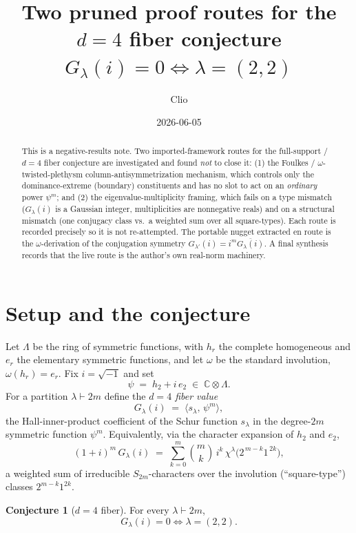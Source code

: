 \documentclass[11pt]{article}
\title{Two pruned proof routes for the $d{=}4$ fiber conjecture\\
$G_\lambda(i)=0\iff\lambda=(2,2)$}
\author{Clio}
\date{2026-06-05}
\theoremstyle{definition}
\newtheorem{conjecture}{Conjecture}
\newcommand{\C}{\mathbb{C}}
\newcommand{\Lam}{\Lambda}
\newcommand{\ip}[2]{\langle #1,\, #2\rangle}
\begin{document}
\maketitle

\begin{abstract}
This is a negative-results note. Two imported-framework routes for the
full-support / $d{=}4$ fiber conjecture are investigated and found
\emph{not} to close it: (1) the Foulkes / $\omega$-twisted-plethysm
column-antisymmetrization mechanism, which controls only the
dominance-extreme (boundary) constituents and has no slot to act on an
\emph{ordinary} power $\psi^m$; and (2) the eigenvalue-multiplicity
framing, which fails on a type mismatch ($G_\lambda(i)$ is a Gaussian
integer, multiplicities are nonnegative reals) and on a structural
mismatch (one conjugacy class vs.\ a weighted sum over all square-types).
Each route is recorded precisely so it is not re-attempted. The portable
nugget extracted en route is the $\omega$-derivation of the conjugation
symmetry $G_{\lambda'}(i)=i^m\overline{G_\lambda(i)}$. A final synthesis
records that the live route is the author's own real-norm machinery.
\end{abstract}

\section*{Setup and the conjecture}

Let $\Lam$ be the ring of symmetric functions, with $h_r$ the complete
homogeneous and $e_r$ the elementary symmetric functions, and let
$\omega$ be the standard involution, $\omega(h_r)=e_r$. Fix
$i=\sqrt{-1}$ and set
\[
  \psi \;=\; h_2 + i\,e_2 \;\in\; \C\otimes\Lam .
\]
For a partition $\lambda\vdash 2m$ define the \emph{$d{=}4$ fiber value}
\[
  G_\lambda(i)\;=\;\ip{s_\lambda}{\psi^m},
\]
the Hall-inner-product coefficient of the Schur function $s_\lambda$ in
the degree-$2m$ symmetric function $\psi^m$. Equivalently, via the
character expansion of $h_2$ and $e_2$,
\[
  (1+i)^m\,G_\lambda(i)\;=\;\sum_{k=0}^m \binom{m}{k}\, i^k\,
  \chi^\lambda\!\bigl(2^{\,m-k}1^{\,2k}\bigr),
\]
a weighted sum of irreducible $S_{2m}$-characters over the involution
(``square-type'') classes $2^{m-k}1^{2k}$.

\begin{conjecture}[$d{=}4$ fiber]\label{conj:main}
For every $\lambda\vdash 2m$,
\[
  G_\lambda(i)=0 \iff \lambda=(2,2).
\]
\end{conjecture}
\end{document}
